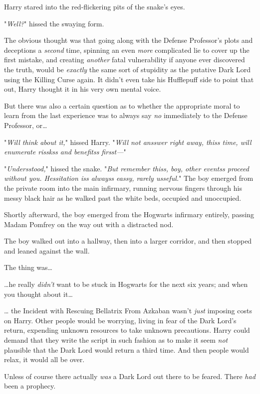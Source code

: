 Harry stared into the red-flickering pits of the snake's eyes.

"\emph{Well?}" hissed the swaying form.

The obvious thought was that going along with the Defense Professor's plots and 
deceptions a \emph{second} time, spinning an even \emph{more} complicated lie 
to cover up the first mistake, and creating \emph{another} fatal vulnerability 
if anyone ever discovered the truth, would be \emph{exactly} the same sort of 
stupidity as the putative Dark Lord using the Killing Curse again. It didn't 
even take his Hufflepuff side to point that out, Harry thought it in his very 
own mental voice.

But there was also a certain question as to whether the appropriate moral to 
learn from the last experience was to always say \emph{no} immediately to the 
Defense Professor, or{\ldots}

"\emph{Will think about it,}" hissed Harry. "\emph{Will not ansswer right away, 
thiss time, will enumerate risskss and benefitss firsst---}"

"\emph{Undersstood,}" hissed the snake. "\emph{But remember thiss, boy, other 
eventss proceed without you. Hessitation iss alwayss eassy, rarely usseful.}"
\sbreak
The boy emerged from the private room into the main infirmary, running nervous 
fingers through his messy black hair as he walked past the white beds, occupied 
and unoccupied.

Shortly afterward, the boy emerged from the Hogwarts infirmary entirely, 
passing Madam Pomfrey on the way out with a distracted nod.

The boy walked out into a hallway, then into a larger corridor, and then 
stopped and leaned against the wall.

The thing was{\ldots}

{\ldots}he really \emph{didn't} want to be stuck in Hogwarts for the next six 
years; and when you thought about it{\ldots}

{\ldots} the Incident with Rescuing Bellatrix From Azkaban wasn't \emph{just} 
imposing costs on Harry. Other people would be worrying, living in fear of the 
Dark Lord's return, expending unknown resources to take unknown precautions. 
Harry could demand that they write the script in such fashion as to make it 
seem \emph{not} plausible that the Dark Lord would return a third time. And 
then people would relax, it would all be over.

Unless of course there actually \emph{was} a Dark Lord out there to be feared. 
There \emph{had} been a prophecy.

